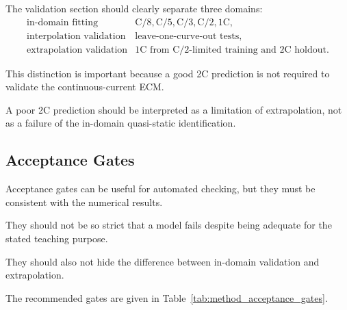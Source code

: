 \documentclass[a4paper,12pt]{article}
\begin{document}
The validation section should clearly separate three domains:
\[
\begin{array}{ll}
\text{in-domain fitting}        & \mathrm{C/8},\mathrm{C/5},\mathrm{C/3},\mathrm{C/2},1\mathrm{C},\\
\text{interpolation validation} & \text{leave-one-curve-out tests},\\
\text{extrapolation validation} & 1\mathrm{C}\text{ from C/2-limited training and }2\mathrm{C}\text{ holdout}.
\end{array}
\]

This distinction is important because a good 2C prediction is not required to validate the continuous-current ECM.

A poor 2C prediction should be interpreted as a limitation of extrapolation, not as a failure of the in-domain quasi-static identification.

\subsection{Acceptance Gates}

Acceptance gates can be useful for automated checking, but they must be consistent with the numerical results.

They should not be so strict that a model fails despite being adequate for the stated teaching purpose.

They should also not hide the difference between in-domain validation and extrapolation.

The recommended gates are given in Table~\ref{tab:method_acceptance_gates}.
\end{document}
